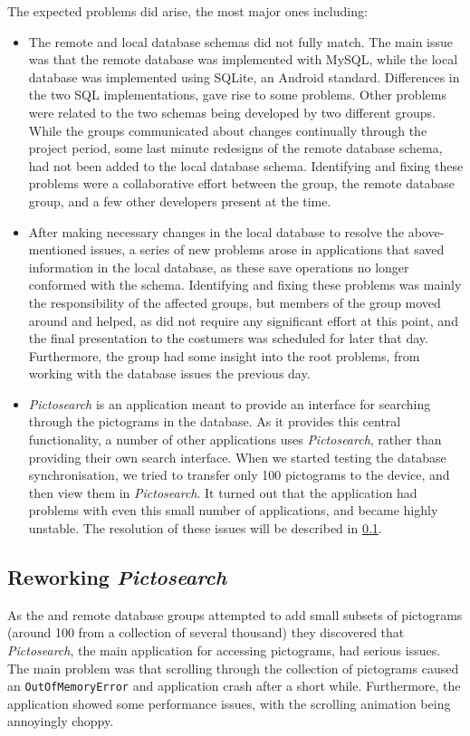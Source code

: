 The expected problems did arise, the most major ones including:
\begin{itemize}
	\item The remote and local database schemas did not fully match. The main issue was that the remote database was implemented with MySQL, while the local database was implemented using SQLite, an Android standard. Differences in the two SQL implementations, gave rise to some problems. Other problems were related to the two schemas being developed by two different groups. While the groups communicated about changes continually through the project period, some last minute redesigns of the remote database schema, had not been added to the local database schema. Identifying and fixing these problems were a collaborative effort between the \launcher group, the remote database group, and a few other developers present at the time. 
	\item After making necessary changes in the local database to resolve the above-mentioned issues, a series of new problems arose in applications that saved information in the local database, as these save operations no longer conformed with the schema. Identifying and fixing these problems was mainly the responsibility of the affected groups, but members of the \launcher group moved around and helped, as \launcher did not require any significant effort at this point, and the final presentation to the costumers was scheduled for later that day. Furthermore, the \launcher group had some insight into the root problems, from working with the database issues the previous day.
	\item \textit{Pictosearch} is an application meant to provide an interface for searching through the pictograms in the database. As it provides this central functionality, a number of other applications uses \textit{Pictosearch}, rather than providing their own search interface. When we started testing the database synchronisation, we tried to transfer only 100 pictograms to the device, and then view them in \textit{Pictosearch}. It turned out that the application had problems with even this small number of applications, and became highly unstable. The resolution of these issues will be described in \cref{sec:collab:remotedb:pictosearch}.
\end{itemize}

\subsection{Reworking \textit{Pictosearch}}
\label{sec:collab:remotedb:pictosearch}
As the \launcher and remote database groups attempted to add small subsets of pictograms (around 100 from a collection of several thousand) they discovered that \textit{Pictosearch}, the main application for accessing pictograms, had serious issues. The main problem was that scrolling through the collection of pictograms caused an \lstinline!OutOfMemoryError! and application crash after a short while. Furthermore, the application showed some performance issues, with the scrolling animation being annoyingly choppy.

